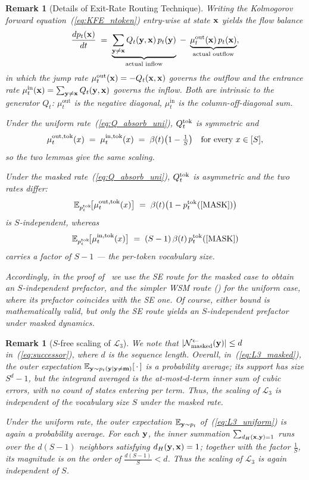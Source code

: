 \documentclass{article} %
\newtheorem{remark}[theorem]{Remark}
\def\eqref#1{equation~\ref{#1}}
\newcommand{\bfx}{{\bf x}}
\newcommand{\bfy}{ {\bf y}}
\newcommand{\bfm}{{\bf m}}
\newcommand{\mask}{\text{[MASK]}}
\renewcommand{\eqref}[1]{\textup{(\ref{#1})}}
\newcommand{\distH}[2]{d_H(#1, #2)}
\newcommand{\LThree}{\mathcal{L}_{3}}
\newcommand{\Nmasked}{\mathcal{N}^{\leftarrow}_{\text{masked}}}
\begin{document}
\begin{remark}[Details of Exit-Rate Routing Technique]\label{rmk:uniform_vs_masked}
Writing the Kolmogorov forward equation~\eqref{eq:KFE_ntoken} entry-wise 
at state $\bfx$ yields the \emph{flow balance}
\[
  \frac{dp_t(\bfx)}{dt} 
  \;=\; \underbrace{\sum_{\bfy \neq \bfx} Q_t(\bfy, \bfx)\,p_t(\bfy)}_{\text{actual inflow}} 
  \;-\; \underbrace{\mu^\mathrm{out}_t(\bfx)\,p_t(\bfx)}_{\text{actual outflow}},
\]
in which the jump rate $\mu^\mathrm{out}_t(\bfx) = -Q_t(\bfx, \bfx)$ governs the 
outflow and the entrance rate $\mu^\mathrm{in}_t(\bfx) = \sum_{\bfy \neq \bfx} Q_t(\bfy, \bfx)$ 
governs the inflow. Both are intrinsic to the generator $Q_t$: $\mu^\mathrm{out}_t$ 
is the negative diagonal, $\mu^\mathrm{in}_t$ is the column-off-diagonal sum.


\smallskip
\noindent Under the \emph{uniform rate}~\eqref{eq:Q_absorb_uni}, $Q_t^{\rm tok}$ 
is symmetric and
\[
  \mu_t^{\rm out, tok}(x) \;=\; \mu_t^{\rm in, tok}(x) \;=\; \beta(t)\bigl(1 - \tfrac{1}{S}\bigr)
  \quad \text{for every } x \in [S],
\]
so the two lemmas give the same scaling.

\smallskip
\noindent Under the \emph{masked rate}~\eqref{eq:Q_absorb_uni}, $Q_t^{\rm tok}$ 
is asymmetric and the two rates differ:
\[
  \mathbb{E}_{p_t^{\rm tok}}\!\bigl[\mu_t^{\rm out, tok}(x)\bigr] 
  \;=\; \beta(t)\bigl(1 - p_t^{\rm tok}(\mask)\bigr)
\]
is $S$-independent, whereas
\[
  \mathbb{E}_{p_t^{\rm tok}}\!\bigl[\mu_t^{\rm in, tok}(x)\bigr] 
  \;=\; (S-1)\,\beta(t)\,p_t^{\rm tok}(\mask)
\]
carries a factor of $S-1$ --- the per-token vocabulary size.

\noindent Accordingly, in the proof of~ we use the SE route 
for the masked case to obtain an 
$S$-independent prefactor, and the simpler WSM route 
() for the uniform case, where its 
prefactor coincides with the SE one. Of course, either bound is mathematically valid, but only the SE 
route yields an $S$-independent prefactor under masked dynamics.
\end{remark}

\begin{remark}[$S$-free scaling of $\LThree$]
We note that $|\Nmasked(\bfy)| \leq d$ in~\eqref{eq:successor}, where $d$ is the sequence length. Overall, in~\eqref{eq:L3_masked}, the outer expectation
$\mathbb{E}_{\bfy \sim p_t(\bfy \mid \bfy \ne \bfm)}[\,\cdot\,]$ is a probability
average; its support has size $S^d - 1$, but the integrand averaged is
the at-most-$d$-term inner sum of cubic errors, with no count
of states entering per term. Thus, the scaling of $\LThree$ is independent of the vocabulary size $S$ under the masked rate.

Under the uniform rate, the outer expectation $\mathbb{E}_{\bfy \sim p_t}$ of~\eqref{eq:L3_uniform} is again a probability average. For each $\bfy$, the inner summation $\sum_{d_H(\bfx,\bfy)=1}$ runs over the $d(S-1)$ neighbors satisfying $\distH{\bfy}{\bfx} = 1$; together with the factor $\frac{1}{S}$, its magnitude is on the order of $\frac{d(S-1)}{S}<d$. Thus the scaling of $\LThree$ is again independent of $S$.
\end{remark}
\end{document}
